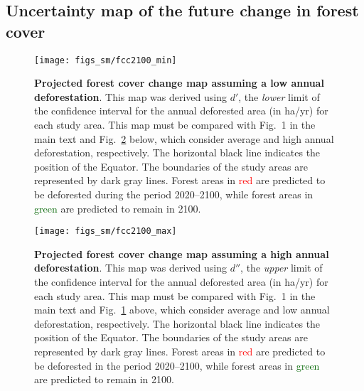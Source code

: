 \documentclass[
  12pt,
]{article}
\begin{document}
\hypertarget{uncertainty-map-of-the-future-change-in-forest-cover}{%
\subsection{Uncertainty map of the future change in forest cover}\label{uncertainty-map-of-the-future-change-in-forest-cover}}



\begin{figure}[H]

{\centering \texttt{[image: figs\_sm/fcc2100\_min]} 

}

\caption{\textbf{Projected forest cover change map assuming a low annual deforestation}. This map was derived using \(d'\), the \emph{lower} limit of the confidence interval for the annual deforested area (in ha/yr) for each study area. This map must be compared with Fig.~1 in the main text and Fig.~\ref{fig:fcc2100-high} below, which consider average and high annual deforestation, respectively. The horizontal black line indicates the position of the Equator. The boundaries of the study areas are represented by dark gray lines. Forest areas in \textcolor{red}{red} are predicted to be deforested during the period 2020--2100, while forest areas in \textcolor{darkgreen}{green} are predicted to remain in 2100.}\label{fig:fcc2100-low}
\end{figure}



\begin{figure}[H]

{\centering \texttt{[image: figs\_sm/fcc2100\_max]} 

}

\caption{\textbf{Projected forest cover change map assuming a high annual deforestation}. This map was derived using \(d''\), the \emph{upper} limit of the confidence interval for the annual deforested area (in ha/yr) for each study area. This map must be compared with Fig.~1 in the main text and Fig.~\ref{fig:fcc2100-low} above, which consider average and low annual deforestation, respectively. The horizontal black line indicates the position of the Equator. The boundaries of the study areas are represented by dark gray lines. Forest areas in \textcolor{red}{red} are predicted to be deforested in the period 2020--2100, while forest areas in \textcolor{darkgreen}{green} are predicted to remain in 2100.}\label{fig:fcc2100-high}
\end{figure}
\end{document}
